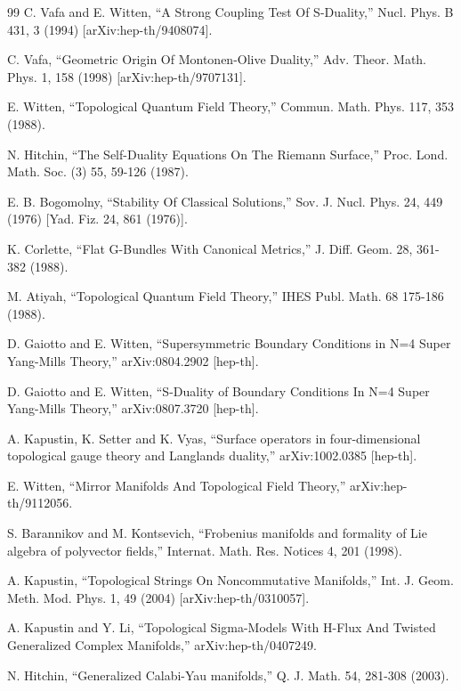 \documentclass[11pt,a4paper,UTF8]{ctexart}
\begin{document}
\begin{thebibliography}{99}
C. Vafa and E. Witten, ``A Strong Coupling Test Of S-Duality,'' Nucl. Phys. B 431, 3 (1994) [arXiv:hep-th/9408074].

C. Vafa, ``Geometric Origin Of Montonen-Olive Duality,'' Adv. Theor. Math. Phys. 1, 158 (1998) [arXiv:hep-th/9707131].

E. Witten, ``Topological Quantum Field Theory,'' Commun. Math. Phys. 117, 353 (1988).

N. Hitchin, ``The Self-Duality Equations On The Riemann Surface,'' Proc. Lond. Math. Soc. (3) 55, 59-126 (1987).

E. B. Bogomolny, ``Stability Of Classical Solutions,'' Sov. J. Nucl. Phys. 24, 449 (1976) [Yad. Fiz. 24, 861 (1976)].

K. Corlette, ``Flat G-Bundles With Canonical Metrics,'' J. Diff. Geom. 28, 361-382 (1988).

M. Atiyah, ``Topological Quantum Field Theory,'' IHES Publ. Math. 68 175-186 (1988).


D. Gaiotto and E. Witten, ``Supersymmetric Boundary Conditions in N=4 Super Yang-Mills Theory,'' arXiv:0804.2902 [hep-th].

D. Gaiotto and E. Witten, ``S-Duality of Boundary Conditions In N=4 Super Yang-Mills Theory,'' arXiv:0807.3720 [hep-th].

A. Kapustin, K. Setter and K. Vyas, ``Surface operators in four-dimensional topological gauge theory and Langlands duality,'' arXiv:1002.0385 [hep-th].

E. Witten, ``Mirror Manifolds And Topological Field Theory,'' arXiv:hep-th/9112056.

S. Barannikov and M. Kontsevich, ``Frobenius manifolds and formality of Lie algebra of polyvector fields,'' Internat. Math. Res. Notices 4, 201 (1998).

A. Kapustin, ``Topological Strings On Noncommutative Manifolds,'' Int. J. Geom. Meth. Mod. Phys. 1, 49 (2004) [arXiv:hep-th/0310057].

A. Kapustin and Y. Li, ``Topological Sigma-Models With H-Flux And Twisted Generalized Complex Manifolds,'' arXiv:hep-th/0407249.

N. Hitchin, ``Generalized Calabi-Yau manifolds,'' Q. J. Math. 54, 281-308 (2003).


\end{thebibliography}
\end{document}
